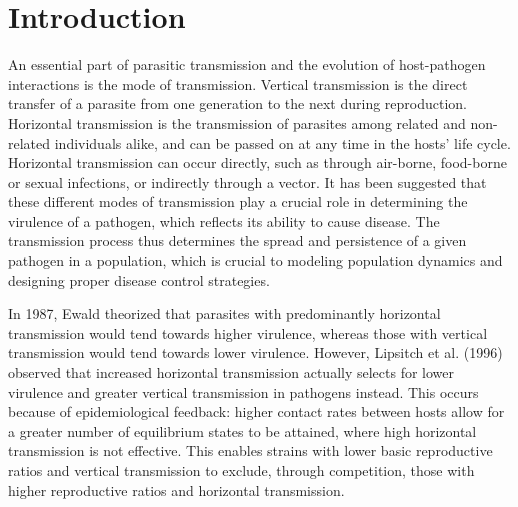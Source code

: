 \section{Introduction}
An essential part of parasitic transmission and the evolution of host-pathogen interactions is the mode of transmission.
Vertical transmission is the direct transfer of a parasite from one generation to the next during reproduction.
Horizontal transmission is the transmission of parasites among related and non-related individuals alike, and can be passed on at any time in the hosts’ life cycle\supercite{Ebert:2013}.
Horizontal transmission can occur directly, such as through air-borne, food-borne or sexual infections, or indirectly through a vector\supercite{CHEN2006}.
It has been suggested that these different modes of transmission play a crucial role in determining the virulence of a pathogen\supercite{Clayton:1994,EWALD:2011}, which reflects its ability to cause disease\supercite{PAYNE2017}.
The transmission process thus determines the spread and persistence of a given pathogen in a population, which is crucial to modeling population dynamics and designing proper disease control strategies.

In 1987, Ewald\supercite{Ewald:1987} theorized that parasites with predominantly horizontal transmission would tend towards higher virulence, whereas those with vertical transmission would tend towards lower virulence.
However, Lipsitch et al. (1996)\supercite{Lipsitch:1996} observed that increased horizontal transmission actually selects for lower virulence and greater vertical transmission in pathogens instead.
This occurs because of epidemiological feedback: higher contact rates between hosts allow for a greater number of equilibrium states to be attained, where high horizontal transmission is not effective\supercite{Lipsitch:1995}.
This enables strains with lower basic reproductive ratios and vertical transmission to exclude, through competition, those with higher reproductive ratios and horizontal transmission.

